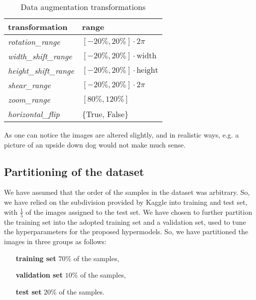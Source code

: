\begin{table}[h]
    \centering
    \begin{tabular}{ll}
        \textbf{transformation} & \textbf{range} \\
        \midrule
        \textsl{rotation\_range} & $\left[-20\% , 20\%\right]\cdot 2\pi$ \\
        \textsl{width\_shift\_range} & $\left[-20\%, 20\% \right]\cdot \text{width}$ \\
        \textsl{height\_shift\_range} & $\left[-20\%, 20\%\right]\cdot \text{height}$ \\
        \textsl{shear\_range} & $\left[-20\% , 20\%\right]\cdot 2\pi$ \\
        \textsl{zoom\_range} & $\left[80\%, 120\%\right]$ \\
        \textsl{horizontal\_flip} & \{True, False\} \\
    \end{tabular}
    \caption{Data augmentation transformations}
    \label{tab:dataAugmentation}
\end{table}

As one can notice the images are altered slightly, and in realistic ways, e.g. a picture of an upside down dog would not make much sense.

\subsection{Partitioning of the dataset}
We have assumed that the order of the samples in the dataset was arbitrary. So, we have relied on the subdivision provided by Kaggle into training and test set, with $\frac{1}{5}$ of the images assigned to the test set. We have chosen to further partition the training set into the adopted training set and a validation set, used to tune the hyperparameters for the proposed hypermodels. So, we have partitioned the images in three groups as follows:

\begin{itemize}
    \centering
    \item[\textbf{training set}]  $70\%$ of the samples,
    \item[\textbf{validation set}]  $10\%$ of the samples,  
    \item[\textbf{test set}] $20\%$ of the samples. 
\end{itemize}